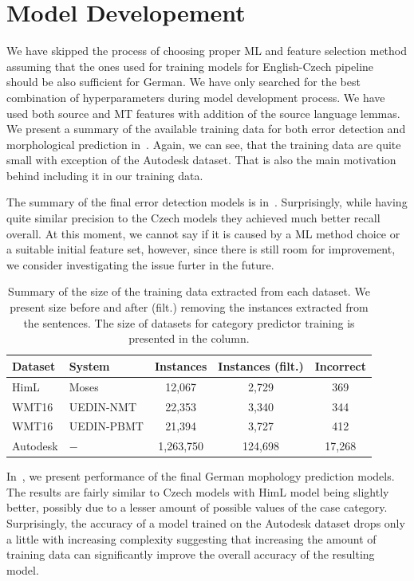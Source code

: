 \section{Model Developement}

We have skipped the process of choosing proper ML and feature selection method
assuming that the ones used for training models for English-Czech pipeline should
be also sufficient for German. We have only searched for the best combination
of hyperparameters during model development process. We have used both source
and MT features with addition of the source language lemmas. We present a summary
of the available training data for both error detection and morphological prediction in~.
Again, we can see, that the training data are quite small with exception of the Autodesk
dataset. That is also the main motivation behind including it in our training data.

The summary of the final error detection models is in~. Surprisingly,
while having quite similar precision to the Czech models they achieved much better
recall overall. At this moment, we cannot say if it is caused by a ML method choice or a suitable
initial feature set, however, since there is still room for improvement, we consider investigating
the issue furter in the future.

\begin{table}[t]
\centering
\small

\begin{tabular}{ll|ccc}
Dataset  &  System &  \hash{} Instances  &  \hash{} Instances (filt.)  &  \hash{} Incorrect  \\
\hline
HimL  &  Moses  & 12,067  &  2,729  &  369  \\
WMT16  &  UEDIN-NMT  &  22,353  &  3,340  &  344  \\
WMT16  &  UEDIN-PBMT  &  21,394  &   3,727  &  412  \\
Autodesk  &  $-$  &  1,263,750  &  124,698  &  17,268  \\
\end{tabular}
\caption{
    Summary of the size of the training data extracted from each dataset. We present
size before and after (filt.) removing the instances extracted from the  sentences.
The size of datasets for category predictor training is presented in the  column.
}
\label{wf-cat-data-sum}
\end{table}

In~, we present performance of the final German
mophology prediction models. The results are fairly similar to Czech models with
HimL model being slightly better, possibly due to a lesser amount of possible values
of the case category. Surprisingly, the accuracy of  a model trained on the Autodesk
dataset drops only a little with increasing complexity suggesting that increasing
the amount of training data can significantly improve the overall accuracy of the
resulting model.

